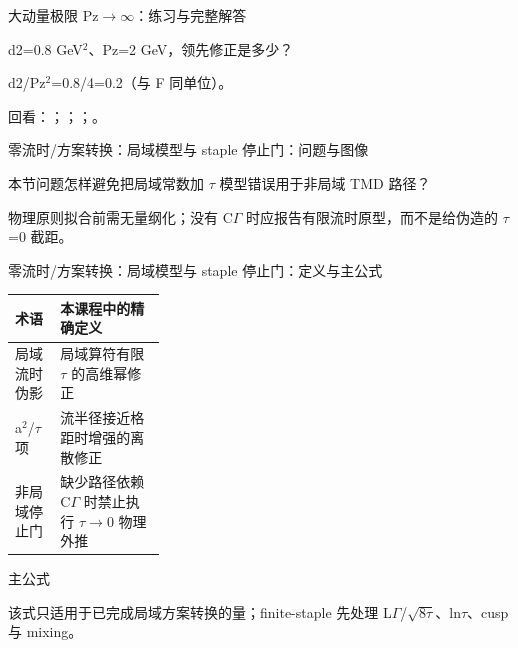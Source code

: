 \begin{frame}[t]{大动量极限 Pz\ensuremath{\rightarrow}\ensuremath{\infty}：练习与完整解答}
\footnotesize
\begin{block}{}d2=0.8 GeV\ensuremath{^{2}}、Pz=2 GeV，领先修正是多少？\end{block}
\begin{exampleblock}{}d2/\allowbreak{}Pz\ensuremath{^{2}}=0.8/\allowbreak{}4=0.2（与 F 同单位）。\end{exampleblock}
\vfill
\scriptsize 回看：；；；。
\end{frame}

\begin{frame}[t]{零流时/\allowbreak{}方案转换：局域模型与 staple 停止门：问题与图像}
\footnotesize
\begin{block}{本节问题}怎样避免把局域常数加 \ensuremath{\tau} 模型错误用于非局域 TMD 路径？\end{block}
\begin{block}{物理原则}\quad 拟合前需无量纲化；没有 C\ensuremath{\Gamma} 时应报告有限流时原型，而不是给伪造的 \ensuremath{\tau}=0 截距。\end{block}
\end{frame}

\begin{frame}[t]{零流时/\allowbreak{}方案转换：局域模型与 staple 停止门：定义与主公式}
\footnotesize\begin{tabularx}{\linewidth}{p{0.30\linewidth}Y}
\toprule 术语 & 本课程中的精确定义\\\midrule
{} 局域流时伪影 & 局域算符有限 \ensuremath{\tau} 的高维幂修正\\
 a\ensuremath{^{2}}/\allowbreak{}\ensuremath{\tau} 项 & 流半径接近格距时增强的离散修正\\
 非局域停止门 & 缺少路径依赖 C\ensuremath{\Gamma} 时禁止执行 \ensuremath{\tau}\ensuremath{\rightarrow}0 物理外推\\
\bottomrule\end{tabularx}\vspace{0.15cm}
\begin{block}{ 主公式}\centering{}\end{block}
该式只适用于已完成局域方案转换的量；finite-staple 先处理 L\ensuremath{\Gamma}/\allowbreak{}\ensuremath{\sqrt{8\tau}}、ln\ensuremath{\tau}、cusp 与 mixing。
\end{frame}

